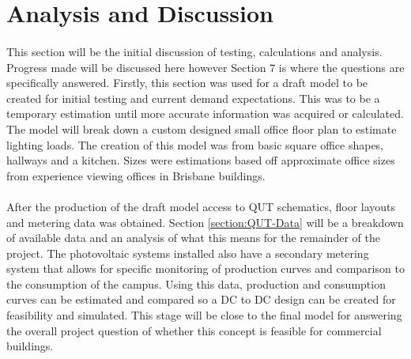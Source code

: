 
\section{Analysis and Discussion}

\paragraph{}
This section will be the initial discussion of testing, calculations and analysis. Progress made will be discussed here however Section 7 is where the questions are specifically answered. Firstly, this section was used for a draft model to be created for initial testing and current demand expectations. This was to be a temporary estimation until more accurate information was acquired or calculated. The model will break down a custom designed small office floor plan to estimate lighting loads. The creation of this model was from basic square office shapes, hallways and a kitchen. Sizes were estimations based off approximate office sizes from experience viewing offices in Brisbane buildings.  

\paragraph{}
After the production of the draft model access to QUT schematics, floor layouts and metering data was obtained. Section \ref{section:QUT-Data} will be a breakdown of available data and an analysis of what this means for the remainder of the project. The photovoltaic systems installed also have a secondary metering system that allows for specific monitoring of production curves and comparison to the consumption of the campus. Using this data, production and consumption curves can be estimated and compared so a DC to DC design can be created for feasibility and simulated. This stage will be close to the final model for answering the overall project question of whether this concept is feasible for commercial buildings.    